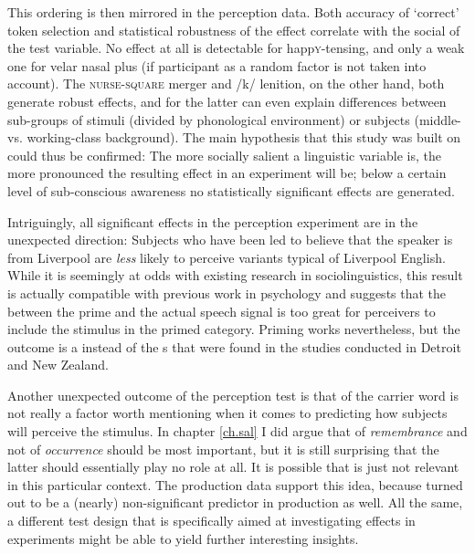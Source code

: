 This ordering is then mirrored in the perception data.
Both accuracy of `correct' token selection and statistical robustness of the  effect correlate with the social  of the test variable.
No effect at all is detectable for happ\textsc{y}-tensing, and only a weak one for velar nasal plus (if participant as a random factor is not taken into account).
The \textsc{nurse}-\textsc{square} merger and /k/ lenition, on the other hand, both generate robust  effects, and for the latter  can even explain differences between sub-groups of stimuli (divided by phonological environment) or subjects (middle- vs. working-class background).
The main hypothesis that this study was built on could thus be confirmed: The more socially salient a linguistic variable is, the more pronounced the resulting effect in an   experiment will be; below a certain level of sub-conscious awareness no statistically significant  effects are generated.

Intriguingly, all significant effects in the perception experiment are in the unexpected direction: Subjects who have been led to believe that the speaker is from Liverpool are \emph{less} likely to perceive variants typical of Liverpool English.
While it is seemingly at odds with existing  research in sociolinguistics, this result is actually compatible with previous work in psychology and suggests that the  between the prime and the actual speech signal is too great for perceivers to include the stimulus in the primed category.
Priming works nevertheless, but the outcome is a  instead of the s that were found in the studies conducted in Detroit and New Zealand.

Another unexpected outcome of the perception test is that  of the carrier word is not really a factor worth mentioning when it comes to predicting how subjects will perceive the stimulus.
In chapter \ref{ch.sal} I did argue that  of \emph{remembrance} and not  of \emph{occurrence} should be most important, but it is still surprising that the latter should essentially play no role at all.
It is possible that  is just not relevant in this particular context.
The production data support this idea, because  turned out to be a (nearly) non-significant predictor in production as well.
All the same, a different test design that is specifically aimed at investigating  effects in  experiments might be able to yield further interesting insights.

